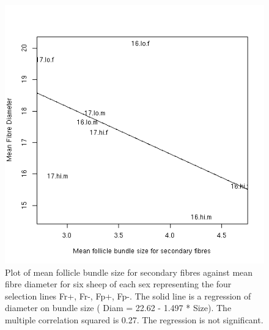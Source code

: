 %

\begin{figure}[!h]
  \centering
   \includegraphics[width=1.0\textwidth]{1617bundledia.png}
  \caption{Plot of mean follicle bundle size for secondary fibres against mean fibre diameter for six sheep of each sex representing the four selection lines Fr+, Fr-, Fp+, Fp-. The solid line is a regression of diameter on bundle size ( Diam = 22.62 - 1.497 * Size). The multiple correlation squared is 0.27. The regression is not significant.}
  \label{fig:1617bundledia}
\end{figure}

%

